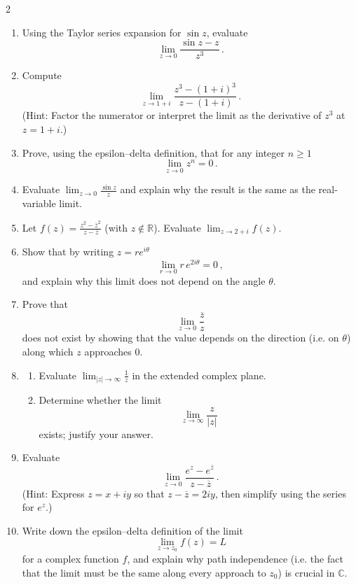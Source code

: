 \begin{multicols}{2}
\begin{enumerate}
  \item Using the Taylor series expansion for \(\sin z\), evaluate
    \[
    \lim_{z \to 0} \frac{\sin z - z}{z^3}\,.
    \]

  \item Compute
    \[
    \lim_{z \to 1+i} \frac{z^3 - (1+i)^3}{\,z - (1+i)}\,.
    \]
    (Hint: Factor the numerator or interpret the limit as the derivative of \(z^3\) at \(z=1+i\).)

  \item Prove, using the epsilon–delta definition, that for any integer \(n \ge 1\)
    \[
    \lim_{z\to 0} z^n = 0\,.
    \]

\item Evaluate $\lim_{z \to 0} \frac{\sin z}{z}$ and explain why the result is the same as the real-variable limit.

\item Let \( f(z)=\frac{z^2-\overline{z}^2}{\,z-\overline{z}} \) (with \(z\notin\mathbb{R}\)). Evaluate \( \displaystyle \lim_{z\to 2+i} f(z) \).

  \item Show that by writing \(z = re^{i\theta}\)
    \[
    \lim_{r \to 0} r\,e^{2i\theta} = 0\,,
    \]
    and explain why this limit does not depend on the angle \(\theta\).

  \item Prove that
    \[
    \lim_{z\to 0} \frac{\overline{z}}{z}
    \]
    does not exist by showing that the value depends on the direction (i.e. on \(\theta\)) along which \(z\) approaches \(0\).

  \item 
    \begin{enumerate}
      \item Evaluate \( \displaystyle \lim_{|z|\to\infty} \frac{1}{z}\) in the extended complex plane.
      \item Determine whether the limit
        \[
        \lim_{z\to\infty} \frac{z}{|z|}
        \]
        exists; justify your answer.
    \end{enumerate}

  \item Evaluate
    \[
    \lim_{z\to 0}\frac{e^z - e^{\overline{z}}}{\,z - \overline{z}}\,.
    \]
    (Hint: Express \(z = x+iy\) so that \(z-\overline{z}=2iy\), then simplify using the series for \(e^z\).)

  \item Write down the epsilon–delta definition of the limit
    \[
    \lim_{z\to z_0} f(z) = L
    \]
    for a complex function \(f\), and explain why path independence (i.e. the fact that the limit must be the same along every approach to \(z_0\)) is crucial in \(\mathbb{C}\).


\end{enumerate}
\end{multicols}

